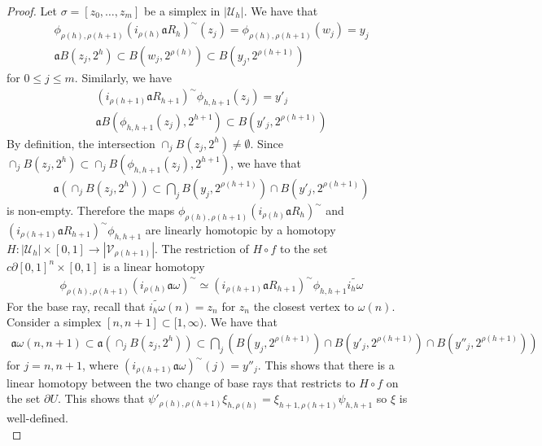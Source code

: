 \documentclass[a4paper,11pt]{article}
\theoremstyle{definition}
\theoremstyle{plain}
\theoremstyle{remark}
\begin{document}
{\begin{proof}
Let $\sigma = [z_0,\dots, z_m]$ be a simplex in $|\mathcal{U}_{h}|$. We have that
\begin{align*}
\phi_{\rho(h), \rho(h+1)}(i_{\rho(h)}\mathfrak{a}R_{h})^{\sim}(z_j) = \phi_{\rho(h), \rho(h+1)}(w_j) = y_j\\
\mathfrak{a}B(z_j,2^h)\subset B(w_j,2^{\rho(h)}) \subset B(y_j,2^{\rho(h+1)})
\end{align*}
 for $0\leq j\leq m$. Similarly, we have 
\begin{align*}
(i_{\rho(h+1)}\mathfrak{a}R_{h+1})^{\sim}\phi_{h,h+1}(z_j) =y'_j\\
\mathfrak{a}B(\phi_{h,h+1}(z_j),2^{h+1})\subset B(y'_j,2^{\rho(h+1)})
\end{align*} 
By definition, the intersection $\cap_{j} B(z_j,2^h)\neq \emptyset$. Since $\cap_{j} B(z_j,2^h) \subset \cap_{j} B(\phi_{h,h+1}(z_j),2^{h+1})$, we have that 
\begin{align*}
\mathfrak{a}(\cap_{j} B(z_j,2^h)) \subset \bigcap_{j} B(y_j,2^{\rho(h+1)}) \cap B(y'_j,2^{\rho(h+1)})
\end{align*} 
is non-empty. Therefore the maps $\phi_{\rho(h), \rho(h+1)}(i_{\rho(h)}\mathfrak{a}R_{h})^{\sim}$ and $(i_{\rho(h+1)}\mathfrak{a}R_{h+1})^{\sim}\phi_{h,h+1}$ are linearly homotopic by a homotopy $H: |\mathcal{U}_{h}| \times [0,1]\rightarrow |\mathcal{V}_{\rho(h+1)}|$. The restriction of $H\circ f$ to the set $c\partial[0,1]^n \times [0,1]$ is a linear homotopy 
\begin{align*}
\phi_{\rho(h), \rho(h+1)} (i_{\rho(h)}\mathfrak{a}\omega)^{\sim}\simeq (i_{\rho(h+1)}\mathfrak{a}R_{h+1})^{\sim}\phi_{h,h+1}\widetilde{i_{h}\omega}  
\end{align*} 
For the base ray, recall that $\widetilde{i_{h}\omega}(n) = z_n$ for $z_n$ the closest vertex to $\omega(n)$. Consider a simplex $[n,n+1]\subset [1,\infty)$. We have that  
\begin{align*}
\mathfrak{a}\omega (n,n+1)\subset \mathfrak{a}(\cap_{j} B(z_j,2^h)) \subset \bigcap_{j} (B(y_j, 2^{\rho(h+1)}) \cap  B(y'_j, 2^{\rho(h+1)}) \cap B(y''_j, 2^{\rho(h+1)}))
\end{align*}
for $j=n,n+1$, where $(i_{\rho(h+1)}\mathfrak{a}\omega)^{\sim}(j) = y''_{j}$. This shows that there is a linear homotopy between the two change of base rays that restricts to $H\circ f$ on the set $\partial U$. This shows that $\psi'_{\rho(h),\rho(h+1)}\xi_{h,\rho(h)}=\xi_{h+1,\rho(h+1)}\psi_{h,h+1}$ so $\xi$ is well-defined. \\


\end{proof}}
\end{document}
